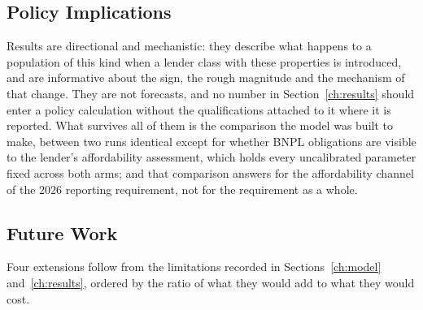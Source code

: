 \subsection{Policy Implications}
\label{sec:policy}


\label{sec:lim-reading}
Results are directional and mechanistic: they describe what happens to a population of this kind
when a lender class with these properties is introduced, and are informative about the sign, the
rough magnitude and the mechanism of that change. They are not forecasts, and no number in
Section~\ref{ch:results} should enter a policy calculation without the qualifications attached to
it where it is reported. What survives all of them is the comparison the model was built to make,
between two runs identical except for whether \ac{BNPL} obligations are visible to the lender's
affordability assessment, which holds every uncalibrated parameter fixed across both arms; and
that comparison answers for the affordability channel of the 2026 reporting requirement, not for
the requirement as a whole.

\subsection{Future Work}
\label{sec:future-work}

Four extensions follow from the limitations recorded in Sections~\ref{ch:model}
and~\ref{ch:results}, ordered by the ratio of what they would add to what they would cost.

